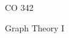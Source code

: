 \documentclass[co342]{subfiles}
\begin{document}
    \begin{titlepage}
    \centering
    \vspace*{8.5cm}
    {\serifastd\huge CO 342 \par}
    \vspace{1cm}
    {\serifastd\Large Graph Theory I \par}
    \vspace*{\fill}
    \cleardoublepage
    \end{titlepage} 

    \toc
\end{document}
